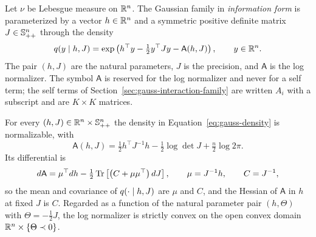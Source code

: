 Let $\nu$ be Lebesgue measure on $\mathbb R^{n}$. The Gaussian family in \emph{information form} is parameterized by a vector $h\in\mathbb R^{n}$ and a symmetric positive definite matrix $J\in\mathbb S_{++}^{n}$ through the density
\begin{equation}
q(y\mid h,J)
=\exp\left(h^\top y-\tfrac12 y^\top Jy-\mathsf A(h,J)\right),
\qquad y\in\mathbb R^{n}.
\label{eq:gauss-density}
\end{equation}
The pair $(h,J)$ are the natural parameters, $J$ is the precision, and $\mathsf A$ is the log normalizer. The symbol $\mathsf A$ is reserved for the log normalizer and never for a self term; the self terms of Section~\ref{sec:gauss-interaction-family} are written $A_i$ with a subscript and are $K\times K$ matrices.

For every $(h,J)\in\mathbb R^{n}\times\mathbb S_{++}^{n}$ the density in Equation~\eqref{eq:gauss-density} is normalizable, with
\begin{equation}
\mathsf A(h,J)
=\tfrac12 h^\top J^{-1}h-\tfrac12\log\det J+\tfrac n2\log 2\pi.
\label{eq:gauss-lognorm}
\end{equation}
Its differential is
\begin{equation}
d\mathsf A=\mu^\top dh-\tfrac12\operatorname{Tr}\left[\left(C+\mu\mu^\top\right)dJ\right],
\qquad
\mu=J^{-1}h,
\qquad
C=J^{-1},
\label{eq:gauss-moments}
\end{equation}
so the mean and covariance of $q(\cdot\mid h,J)$ are $\mu$ and $C$, and the Hessian of $\mathsf A$ in $h$ at fixed $J$ is $C$. Regarded as a function of the natural parameter pair $(h,\Theta)$ with $\Theta=-\tfrac12J$, the log normalizer is strictly convex on the open convex domain $\mathbb R^{n}\times\{\Theta\prec0\}$. 

